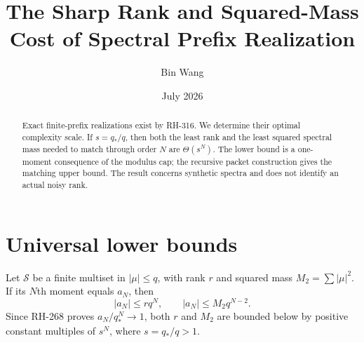 \documentclass[11pt]{article}
\title{The Sharp Rank and Squared-Mass Cost of Spectral Prefix Realization}
\author{Bin Wang}\date{July 2026}
\theoremstyle{remark}\newtheorem{remark}[theorem]{Remark}
\begin{document}
\maketitle
\begin{abstract}
Exact finite-prefix realizations exist by RH-316.  We determine their optimal
complexity scale.  If $s=q_*/q$, then both the least rank and the least
squared spectral mass needed to match through order $N$ are
$\Theta(s^N)$.  The lower bound is a one-moment consequence of the modulus
cap; the recursive packet construction gives the matching upper bound.  The
result concerns synthetic spectra and does not identify an actual noisy rank.
\end{abstract}

\section{Universal lower bounds}
Let $\mathcal S$ be a finite multiset in $|\mu|\le q$, with rank $r$ and
squared mass $M_2=\sum|\mu|^2$.  If its $N$th moment equals $a_N$, then
\[
 |a_N|\le rq^N,
 \qquad
 |a_N|\le M_2q^{N-2}.
\]
Since RH-268 proves $a_N/q_*^N\to1$, both $r$ and $M_2$ are bounded below by
positive constant multiples of $s^N$, where $s=q_*/q>1$.
\end{document}

